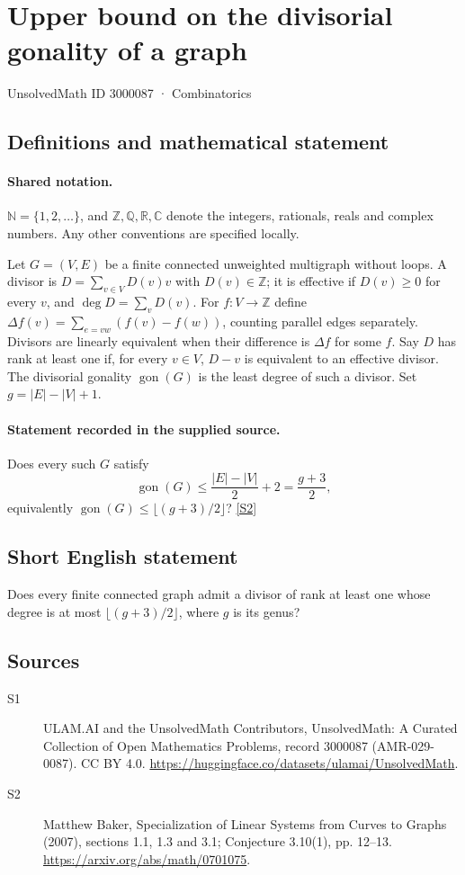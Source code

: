 \documentclass[11pt]{article}
\newcommand{\sref}[2]{\hyperlink{source:#1:#2}{[S#2]}}
\begin{document}
\setcounter{section}{3000086}
\section{Upper bound on the divisorial gonality of a graph}\label{3000087}
{\small\sffamily UnsolvedMath ID 3000087 · Combinatorics}
\subsection{Definitions and mathematical statement}

\paragraph{Shared notation.}$\mathbb N=\{1,2,\ldots\}$, and $\mathbb Z,\mathbb Q,\mathbb R,\mathbb C$ denote the integers, rationals, reals and complex numbers. Any other conventions are specified locally.


Let $G=(V,E)$ be a finite connected unweighted multigraph without loops. A divisor is $D=\sum_{v\in V}D(v)v$ with $D(v)\in\mathbb Z$; it is effective if $D(v)\geq0$ for every $v$, and $\deg D=\sum_vD(v)$. For $f:V\to\mathbb Z$ define $\Delta f(v)=\sum_{e=vw}(f(v)-f(w))$, counting parallel edges separately. Divisors are linearly equivalent when their difference is $\Delta f$ for some $f$. Say $D$ has rank at least one if, for every $v\in V$, $D-v$ is equivalent to an effective divisor. The divisorial gonality $\operatorname{gon}(G)$ is the least degree of such a divisor. Set $g=|E|-|V|+1$.
\paragraph{Statement recorded in the supplied source.}
Does every such $G$ satisfy
\[\operatorname{gon}(G)\leq\frac{|E|-|V|}{2}+2=\frac{g+3}{2},\]
equivalently $\operatorname{gon}(G)\leq\lfloor(g+3)/2\rfloor$? \sref{3000087}{2}
\subsection{Short English statement}
Does every finite connected graph admit a divisor of rank at least one whose degree is at most $\lfloor(g+3)/2\rfloor$, where $g$ is its genus?
\subsection{Sources}
\begin{description}
\item[\hypertarget{source:3000087:1}{S1}] ULAM.AI and the UnsolvedMath Contributors, UnsolvedMath: A Curated Collection of Open Mathematics Problems, record 3000087 (AMR-029-0087). CC BY 4.0. \url{https://huggingface.co/datasets/ulamai/UnsolvedMath}.
\item[\hypertarget{source:3000087:2}{S2}] Matthew Baker, Specialization of Linear Systems from Curves to Graphs (2007), sections 1.1, 1.3 and 3.1; Conjecture 3.10(1), pp. 12--13. \url{https://arxiv.org/abs/math/0701075}.
\end{description}
\label{end:3000087}
\end{document}
